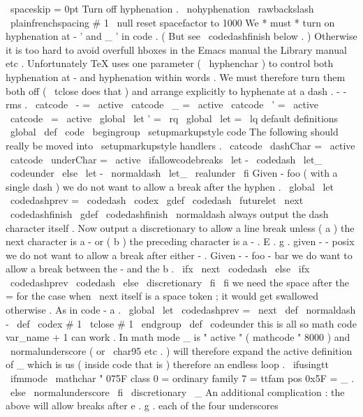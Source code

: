 {{{{{{{
\
spaceskip
=
0pt
{
}
}
}
%
%
%
Turn
off
hyphenation
.
\
nohyphenation
%
\
rawbackslash
\
plainfrenchspacing
#
1
%
}
%
\
null
%
reset
spacefactor
to
1000
}
%
We
*
must
*
turn
on
hyphenation
at
-
'
and
_
'
in
code
.
%
(
But
see
\
codedashfinish
below
.
)
%
Otherwise
it
is
too
hard
to
avoid
overfull
hboxes
%
in
the
Emacs
manual
the
Library
manual
etc
.
%
%
Unfortunately
TeX
uses
one
parameter
(
\
hyphenchar
)
to
control
%
both
hyphenation
at
-
and
hyphenation
within
words
.
%
We
must
therefore
turn
them
both
off
(
\
tclose
does
that
)
%
and
arrange
explicitly
to
hyphenate
at
a
dash
.
-
-
rms
.
{
\
catcode
\
-
=
\
active
\
catcode
\
_
=
\
active
\
catcode
\
'
=
\
active
\
catcode
\
=
\
active
\
global
\
let
'
=
\
rq
\
global
\
let
=
\
lq
%
default
definitions
%
\
global
\
def
\
code
{
\
begingroup
\
setupmarkupstyle
{
code
}
%
%
The
following
should
really
be
moved
into
\
setupmarkupstyle
handlers
.
\
catcode
\
dashChar
=
\
active
\
catcode
\
underChar
=
\
active
\
ifallowcodebreaks
\
let
-
\
codedash
\
let_
\
codeunder
\
else
\
let
-
\
normaldash
\
let_
\
realunder
\
fi
%
Given
-
foo
(
with
a
single
dash
)
we
do
not
want
to
allow
a
break
%
after
the
hyphen
.
\
global
\
let
\
codedashprev
=
\
codedash
%
\
codex
}
%
\
gdef
\
codedash
{
\
futurelet
\
next
\
codedashfinish
}
\
gdef
\
codedashfinish
{
%
\
normaldash
%
always
output
the
dash
character
itself
.
%
%
Now
output
a
discretionary
to
allow
a
line
break
unless
%
(
a
)
the
next
character
is
a
-
or
%
(
b
)
the
preceding
character
is
a
-
.
%
E
.
g
.
given
-
-
posix
we
do
not
want
to
allow
a
break
after
either
-
.
%
Given
-
-
foo
-
bar
we
do
want
to
allow
a
break
between
the
-
and
the
b
.
\
ifx
\
next
\
codedash
\
else
\
ifx
\
codedashprev
\
codedash
\
else
\
discretionary
{
}
{
}
{
}
\
fi
\
fi
%
we
need
the
space
after
the
=
for
the
case
when
\
next
itself
is
a
%
space
token
;
it
would
get
swallowed
otherwise
.
As
in
code
{
-
a
}
.
\
global
\
let
\
codedashprev
=
\
next
}
}
\
def
\
normaldash
{
-
}
%
\
def
\
codex
#
1
{
\
tclose
{
#
1
}
\
endgroup
}
\
def
\
codeunder
{
%
%
this
is
all
so
math
{
code
{
var_name
}
+
1
}
can
work
.
In
math
mode
_
%
is
"
active
"
(
mathcode
"
8000
)
and
\
normalunderscore
(
or
\
char95
etc
.
)
%
will
therefore
expand
the
active
definition
of
_
which
is
us
%
(
inside
code
that
is
)
therefore
an
endless
loop
.
\
ifusingtt
{
\
ifmmode
\
mathchar
"
075F
%
class
0
=
ordinary
family
7
=
ttfam
pos
0x5F
=
_
.
\
else
\
normalunderscore
\
fi
\
discretionary
{
}
{
}
{
}
}
%
{
\
_
}
%
}
%
An
additional
complication
:
the
above
will
allow
breaks
after
e
.
g
.
%
each
of
the
four
underscores
}}}
